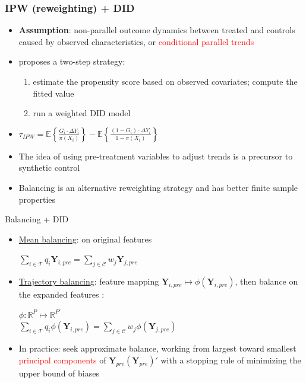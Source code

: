 \documentclass[xcolor=svgnames,9pt,english, aspectratio=169]{beamer}
\newcommand{\red}{\textcolor{red}}
\newcommand{\E}{\mathbb{E}}
\def\T{\mathcal{T}}
\def\C{\mathcal{C}}
\def\bY{\mathbf{Y}}
\begin{document}
\begin{frame}
  \frametitle{IPW (reweighting) + DID}
  \begin{itemize}\itemsep1em
\item \textbf{Assumption}: non-parallel outcome dynamics between treated and
controls caused by observed characteristics, or \red{conditional parallel trends}\pause
    \item \textcite{abadie2005semiparametric} proposes a two-step strategy:
    \begin{enumerate}
      \item estimate the propensity score based on observed covariates; compute the fitted value
      \item run a weighted DID model 
    \end{enumerate}\pause
    \item $\tau_{IPW} = \E\left\{\frac{G_i\cdot \Delta Y_{i}  }{\pi(X_i)} \right\} - \E\left\{\frac{(1-G_i)\cdot \Delta Y_{i}  }{1-\pi(X_i)} \right\}$\pause
    \item The idea of using pre-treatment variables to adjust trends is a precursor to synthetic control\pause
  \item Balancing is an alternative reweighting strategy and has better finite sample
properties   
  \end{itemize}
  \end{frame}


  \begin{frame}{Balancing + DID}
    \begin{itemize}
      \itemsep1.5em
    \item \underline{Mean balancing}: on original features {\small\alert{}}\\
    \begin{center}
    $\sum_{i\in\T} q_{i}\bY_{i,pre} =\sum_{j\in\C} w_{j}\bY_{j, pre}$
    \end{center}\pause
  \item \underline{Trajectory balancing}: feature mapping  $\bY_{i,pre} \mapsto \phi(\bY_{i,pre})$, then balance on the expanded features {\small\alert{\parencite{hazlett2018trajectory}}}:
    \begin{center}
    $\phi: \mathbb{R}^P \mapsto \mathbb{R}^{P'}$\\
    $\sum_{i\in\T} q_{i}\phi(\bY_{i, pre}) = \sum_{j\in\C} w_{j} \phi(\bY_{j,pre})$
    \end{center}\pause
    \item In practice: seek approximate balance, working from largest toward smallest \red{principal components} of $\bY_{pre}(\bY_{pre})'$ with a stopping rule of minimizing the upper bound of biases
  \end{itemize}
  \end{frame}
  
\end{document}
